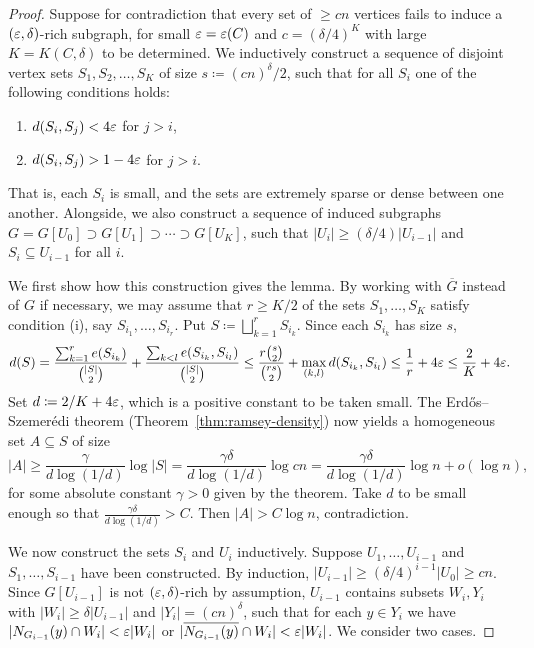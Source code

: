 \begin{proof}
  Suppose for contradiction that every set of $\geq cn$ vertices fails to induce a $(\varepsilon, \delta)$-rich subgraph, for small $\varepsilon = \varepsilon(C)$ and $c = (\delta/4)^{K}$ with large $K = K(C, \delta)$ to be determined. We inductively construct a sequence of disjoint vertex sets $S_1, S_2, \ldots, S_K$ of size $s \coloneqq (cn)^\delta/2$, such that for all $S_i$ one of the following conditions holds:
  \begin{enumerate}
    \item[(i)] $d(S_i, S_j) < 4\varepsilon$ for $j > i$,
    \item[(ii)] $d(S_i, S_j) > 1 - 4\varepsilon$ for $j > i$.
  \end{enumerate}
  That is, each $S_i$ is small, and the sets are extremely sparse or dense between one another. Alongside, we also construct a sequence of induced subgraphs $G = G[U_0] \supset G[U_1] \supset \cdots \supset G[U_K]$, such that $|U_i| \geq (\delta/4)|U_{i - 1}|$ and $S_i \subseteq U_{i - 1}$ for all $i$.

  We first show how this construction gives the lemma. By working with $\overline{G}$ instead of $G$ if necessary, we may assume that $r \geq K/2$ of the sets $S_{1}, \ldots, S_{K}$ satisfy condition (i), say $S_{i_1}, \ldots, S_{i_r}$. Put $S \coloneqq \bigsqcup_{k = 1}^r S_{i_k}$. Since each $S_{i_k}$ has size $s$,
  \[
    d(S) = \frac{\sum_{k = 1}^r e(S_{i_k})}{\binom{|S|}{2}} + \frac{\sum_{k < l} e(S_{i_k}, S_{i_l})}{\binom{|S|}{2}} \leq \frac{r\binom{s}{2}}{\binom{rs}{2}} + \max_{(k, l)} d(S_{i_k}, S_{i_l}) \leq \frac{1}{r} + 4\varepsilon \leq \frac{2}{K} + 4\varepsilon.
  \]
  Set $d \coloneqq 2/K + 4\varepsilon$, which is a positive constant to be taken small. The Erd\H{o}s--Szemer\'{e}di theorem (Theorem~\ref{thm:ramsey-density}) now yields a homogeneous set $A \subseteq S$ of size
  \[
    |A| \geq \frac{\gamma}{d\log(1/d)} \log |S| = \frac{\gamma \delta}{d\log(1/d)} \log cn = \frac{\gamma \delta}{d\log(1/d)} \log n + o(\log n),
  \]
  for some absolute constant $\gamma > 0$ given by the theorem. Take $d$ to be small enough so that $\frac{\gamma \delta}{d\log(1/d)} > C$. Then $|A| > C\log n$, contradiction.

  We now construct the sets $S_i$ and $U_i$ inductively. Suppose $U_1, \ldots, U_{i - 1}$ and $S_1, \ldots, S_{i - 1}$ have been constructed. By induction, $|U_{i - 1}| \geq (\delta/4)^{i - 1}|U_0| \geq cn$. Since $G[U_{i - 1}]$ is not $(\varepsilon, \delta)$-rich by assumption, $U_{i - 1}$ contains subsets $W_i, Y_i$ with $|W_i| \geq \delta|U_{i - 1}|$ and $|Y_i| = (cn)^{\delta}$, such that for each $y \in Y_i$ we have $|N_{G_{i - 1}}(y) \cap W_i| < \varepsilon|W_i|$ or $|\overline{N_{G_{i - 1}}(y)} \cap W_i| < \varepsilon|W_i|$. We consider two cases.


\end{proof}
